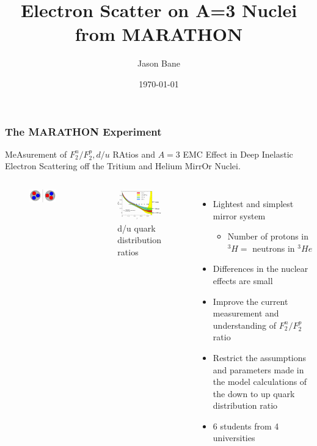 \documentclass{beamer}
\title[MARATHON A=3]{Electron Scatter on A=3 Nuclei from MARATHON } %
\author{Jason Bane} %
\institute[UTK] %
{
	University of Tennessee \\ %
	\medskip
	\textit{jbane1@vols.utk.edu} %
}
\date{\today} %
\begin{document}
\begin{frame}
	\titlepage %
\end{frame}


\begin{frame}
\frametitle{The MARATHON Experiment}
	MeAsurement of $F^n_2/F^p_2, d/u$ RAtios and $A=3$ EMC Effect in Deep Inelastic Electron Scattering off the Tritium and Helium MirrOr Nuclei.
	\vspace{-10pt}
	\begin{columns}[t]
		\begin{figure}
			\includegraphics[width =5cm]{../images/mirror}
		\end{figure}
		\vspace{-25pt}
		\begin{figure}
			\includegraphics[width=5cm]{../images/d_u}
			\caption{d/u quark distribution ratios}
		\end{figure}
		\begin{itemize}
			\item Lightest and simplest mirror system
		\begin{itemize}
			\item  Number of protons in $^3H =$ neutrons in $^3He$
		\end{itemize}
			\item Differences in the nuclear effects are small
			\item Improve the current measurement and understanding of $F^n_2/F^p_2$ ratio
			\item Restrict the assumptions and parameters made in the model calculations of the down to up quark distribution ratio
			\item 6 students from 4 universities
		\end{itemize}
	\end{columns}
\end{frame}
\end{document}
